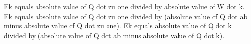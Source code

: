 Ek equals absolute value of Q dot zu one divided by absolute value of W dot k.  
Ek equals absolute value of Q dot zu one divided by (absolute value of Q dot ab minus absolute value of Q dot zu one).  
Ek equals absolute value of Q dot k divided by (absolute value of Q dot ab minus absolute value of Q dot k).